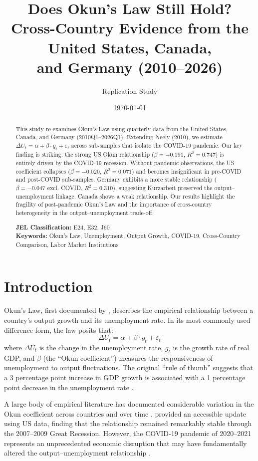 \documentclass[12pt,a4paper]{article}
\title{Does Okun's Law Still Hold? \\
       \large Cross-Country Evidence from the United States, Canada, \\
       and Germany (2010--2026)}
\author{Replication Study}
\date{\today}
\begin{document}
\maketitle

\begin{abstract}
This study re-examines Okun's Law using quarterly data from the United States, Canada, and Germany (2010Q1--2026Q1). Extending Neely (2010), we estimate $\Delta U_t = \alpha + \beta \cdot g_t + \varepsilon_t$ across sub-samples that isolate the COVID-19 pandemic. Our key finding is striking: the strong US Okun relationship ($\beta = -0.191$, $R^2 = 0.747$) is entirely driven by the COVID-19 recession. Without pandemic observations, the US coefficient collapses ($\beta = -0.020$, $R^2 = 0.071$) and becomes insignificant in pre-COVID and post-COVID sub-samples. Germany exhibits a more stable relationship ($\beta = -0.047$ excl. COVID, $R^2 = 0.310$), suggesting Kurzarbeit preserved the output--unemployment linkage. Canada shows a weak relationship. Our results highlight the fragility of post-pandemic Okun's Law and the importance of cross-country heterogeneity in the output--unemployment trade-off.

\textbf{JEL Classification:} E24, E32, J60 \\
\textbf{Keywords:} Okun's Law, Unemployment, Output Growth, COVID-19, Cross-Country Comparison, Labor Market Institutions
\end{abstract}

\newpage

\section{Introduction}

Okun's Law, first documented by \citet{okun1962potential}, describes the empirical relationship between a country's output growth and its unemployment rate. In its most commonly used difference form, the law posits that:
\[
\Delta U_t = \alpha + \beta \cdot g_t + \varepsilon_t
\]
where $\Delta U_t$ is the change in the unemployment rate, $g_t$ is the growth rate of real GDP, and $\beta$ (the ``Okun coefficient'') measures the responsiveness of unemployment to output fluctuations. The original ``rule of thumb'' suggests that a 3 percentage point increase in GDP growth is associated with a 1 percentage point decrease in the unemployment rate \citep{okun1962potential}.

A large body of empirical literature has documented considerable variation in the Okun coefficient across countries and over time \citep{blanchard2013okun, ball2017okun, cbo2021okun}. \citet{neely2010okun} provided an accessible update using US data, finding that the relationship remained remarkably stable through the 2007--2009 Great Recession. However, the COVID-19 pandemic of 2020--2021 represents an unprecedented economic disruption that may have fundamentally altered the output--unemployment relationship \citep{russnak2023okun}.
\end{document}
